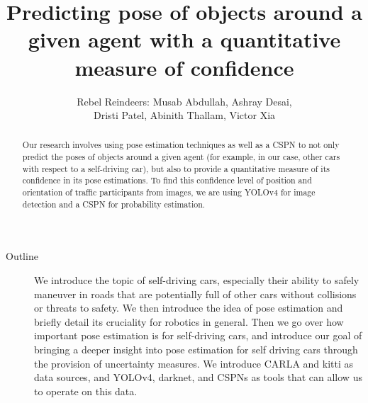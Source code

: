 \documentclass[]{report}
\title{\textbf{Predicting pose of objects around a given agent with a quantitative measure of confidence}}
\author{Rebel Reindeers: Musab Abdullah, Ashray Desai, \\Dristi Patel, Abinith Thallam, Victor Xia}
\begin{document}
\maketitle

\begin{abstract}
	Our research involves using pose estimation techniques as well as a CSPN to not only predict the poses of objects around a given agent (for example, in our case, other cars with respect to a self-driving car), but also to provide a quantitative measure of its confidence in its pose estimations. To find this confidence level of position and orientation of traffic participants from images, we are using YOLOv4 for image detection and a CSPN for probability estimation.
\end{abstract}

\begin{description}
	\item[Outline] We introduce the topic of self-driving cars, especially their ability to safely maneuver in roads that are potentially full of other cars without collisions or threats to safety. We then introduce the idea of pose estimation and briefly detail its cruciality for robotics in general. Then we go over how important pose estimation is for self-driving cars, and introduce our goal of bringing a deeper insight into pose estimation for self driving cars through the provision of uncertainty measures. We introduce CARLA and kitti as data sources, and YOLOv4, darknet, and CSPNs as tools that can allow us to operate on this data.
\end{description}
	
\end{document}
